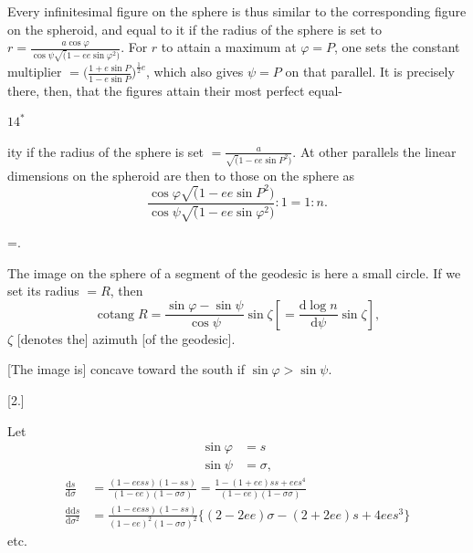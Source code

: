 \noindent Every infinitesimal figure on the sphere is thus similar to the
corresponding figure on the spheroid, and equal to it if the radius of the sphere
is set to \(r=\frac{a\cos\varphi}{\cos\psi\surd(1-ee\sin\varphi^2)}\). For \(r\) to attain a maximum at \(\varphi=P\),
one sets the constant multiplier
\(=\bigl(\frac{1+e\sin P}{1-e\sin P}\bigr)^{\frac12 e}\), which also gives \(\psi=P\) on that parallel.
It is precisely there, then, that the figures attain their most perfect equal-
\par\smallskip
\noindent\hfill \(14^{*}\)\hspace{.12\textwidth}\par

\par\clearpage
\noindent{}\makebox[12mm][r]{}\par\medskip

\noindent ity if the radius of the sphere is set
\(=\frac a{\surd(1-ee\sin P^2)}\). At other parallels the linear dimensions
on the spheroid are then to those on the sphere as
\[
\frac{\cos\varphi\surd(1-ee\sin P^2)}{\cos\psi\surd(1-ee\sin\varphi^2)}:1=1:n.
\]

=\frac{\sin\varphi-\sin\psi}{\cos\psi}.
\]

\noindent The image on the sphere of a segment of the geodesic is here a
small circle. If we set its radius \(=R\), then
\[
\operatorname{cotang} R=\frac{\sin\varphi-\sin\psi}{\cos\psi}\sin\zeta
\left[=\frac{\mathrm d\log n}{\mathrm d\psi}\sin\zeta\right],
\]
\noindent [where] \(\zeta\) [denotes the] azimuth [of the geodesic].

[The image is] concave toward the south if \(\sin\varphi>\sin\psi\).

\bigskip
\begin{center}[2.]\end{center}
Let
\[
\begin{aligned}
\sin\varphi&=s\\
\sin\psi&=\sigma,
\end{aligned}
\]
\noindent [so that]
\[
\begin{aligned}
\frac{\mathrm ds}{\mathrm d\sigma}
&=\frac{(1-eess)(1-ss)}{(1-ee)(1-\sigma\sigma)}
=\frac{1-(1+ee)ss+ees^4}{(1-ee)(1-\sigma\sigma)}\\
\frac{\mathrm{dd}s}{\mathrm d\sigma^2}
&=\frac{(1-eess)(1-ss)}{(1-ee)^2(1-\sigma\sigma)^2}
\{(2-2ee)\sigma-(2+2ee)s+4ees^3\}
\end{aligned}
\]
\noindent\hfill etc.\hfill\null\par

